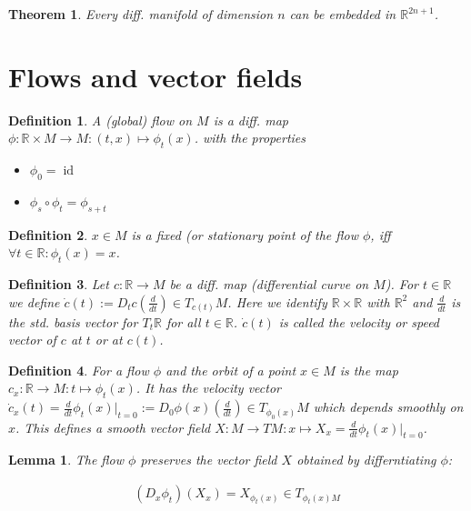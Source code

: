 \documentclass{scrartcl}
\newcommand{\R}{\mathbb R}
\newtheorem*{mydef}{Definition}
\newtheorem*{lemma}{Lemma}
\newtheorem*{thm}{Theorem}
\begin{document}
\begin{thm}
  Every diff. manifold of dimension $n$ can be embedded in $\R^{2n+1}$.
\end{thm}

\section{Flows and vector fields}

\begin{mydef}
  A (global) flow on $M$ is a diff. map $\phi:\R\times M\rightarrow M: (t,x)\mapsto \phi_t(x)$. with the properties

  \begin{itemize}
  \item $\phi_0=\operatorname{id}$
  \item $\phi_s \circ \phi_t=\phi_{s+t}$
  \end{itemize}
\end{mydef}

\begin{mydef}
  $x\in M$ is a \emph{fixed (or stationary point} of the flow $\phi$, iff $\forall t\in \R: \phi_t(x)=x$.
\end{mydef}

\begin{mydef}
  Let $c:\R\rightarrow M$ be a diff. map (differential curve on $M$). For $t\in \R$ we define $\dot c(t):=D_t c \left(\tfrac d{dt}\right) \in T_{c(t)}M$. Here we identify $\R\times\R$ with $\R^2$ and $\tfrac d{dt}$ is the std. basis vector for $T_t \R$ for all $t\in \R$. $\dot c(t)$ is called the \emph{velocity} or \emph{speed vector} of $c$ at $t$ or at $c(t)$.
\end{mydef}

\begin{mydef}
  For a flow $\phi$ and \emph{the orbit} of a point $x\in M$ is the map $c_x:\R\rightarrow M:t\mapsto \phi_t(x)$. It has the velocity vector $\dot c_x(t)=\tfrac d{dt} \phi_t(x)|_{t=0}:= D_0 \phi(x)\left(\tfrac d{dt}\right) \in T_{\phi_0(x)} M$ which depends smoothly on $x$. This defines a smooth vector field $X:M\rightarrow TM:x\mapsto X_x=\tfrac d{dt} \phi_t(x)|_{t=0}$.
\end{mydef}

\begin{lemma}
  The flow $\phi$ preserves the vector field $X$ obtained by differntiating $\phi$:

  \begin{align}
    (D_x \phi_t)(X_x) = X_{\phi_t(x)} \in T_{\phi_t(x) M}
  \end{align}
\end{lemma}
\end{document}
